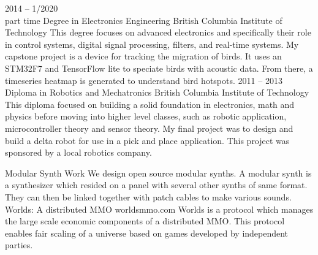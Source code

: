 \documentclass[9pt]{developercv} %
\begin{document}


\begin{entrylist}
	\entry
		{2014 -- 1/2020\\ \footnotesize{part time}}
		{Degree in Electronics Engineering}
		{British Columbia Institute of Technology}
		{This degree focuses on advanced electronics and specifically their role in control systems, digital signal processing, filters, and real-time systems. My capstone project is a device for tracking the migration of birds. It uses an STM32F7 and TensorFlow lite to speciate birds with acoustic data. From there, a timeseries heatmap is generated to understand bird hotspots.}
	\entry
		{2011 -- 2013}
		{Diploma in Robotics and Mechatronics}
		{British Columbia Institute of Technology}
		{This diploma focused on building a solid foundation in electronics, math and physics before moving into higher level classes, such as robotic application, microcontroller theory and sensor theory. My final project was to design and build a delta robot for use in a pick and place application. This project was sponsored by a local robotics company.}
\end{entrylist}



\begin{entrylist}
	\entry
		{}
		{Modular Synth Work}
		{}
		{We design open source modular synths. A modular synth is a synthesizer which resided on a panel with several other synths of same format. They can then be linked together with patch cables to make various sounds.}
	\entry
		{}
		{Worlds: A distributed MMO}
		{worldsmmo.com}
		{Worlds is a protocol which manages the large scale economic components of a distributed MMO. This protocol enables fair scaling of a universe based on games developed by independent parties.}

\end{entrylist}
\end{document}
